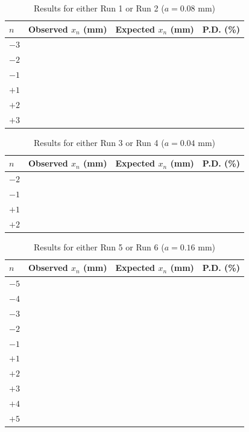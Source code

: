 \begin{table}[ht!]
    \centering
    \begin{tabular}{|l|r|r|r|}
        \hline
        $n$ & Observed $x_{n}$ (mm) & Expected $x_{n}$ (mm) & P.D. (\%) \\
        \hline
        $-3$ & & & \\
        $-2$ & & & \\
        $-1$ & & & \\
        \hline
        $+1$ & & & \\
        $+2$ & & & \\
        $+3$ & & & \\
        \hline
    \end{tabular}
    \caption{Results for either Run 1 or Run 2 ($a = 0.08$ mm)}
    \label{table.11.results.12}
\end{table}
\begin{table}[ht!]
    \centering
    \begin{tabular}{|l|r|r|r|}
        \hline
        $n$ & Observed $x_{n}$ (mm) & Expected $x_{n}$ (mm) & P.D. (\%) \\
        \hline
        $-2$ & & & \\
        $-1$ & & & \\
        \hline
        $+1$ & & & \\
        $+2$ & & & \\
        \hline
    \end{tabular}
    \caption{Results for either Run 3 or Run 4 ($a = 0.04$ mm)}
    \label{table.11.results.34}
\end{table}
\begin{table}[ht!]
    \centering
    \begin{tabular}{|l|r|r|r|}
        \hline
        $n$ & Observed $x_{n}$ (mm) & Expected $x_{n}$ (mm) & P.D. (\%) \\
        \hline
        $-5$ & & & \\
        $-4$ & & & \\
        $-3$ & & & \\
        $-2$ & & & \\
        $-1$ & & & \\
        \hline
        $+1$ & & & \\
        $+2$ & & & \\
        $+3$ & & & \\
        $+4$ & & & \\
        $+5$ & & & \\
        \hline
    \end{tabular}
    \caption{Results for either Run 5 or Run 6 ($a = 0.16$ mm)}
    \label{table.11.results.56}
\end{table}
